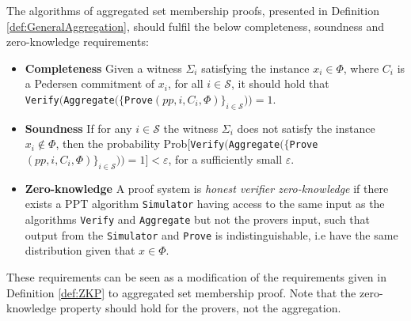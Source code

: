 The algorithms of aggregated set membership proofs, presented in Definition \ref{def:GeneralAggregation}, should fulfil the below completeness, soundness and zero-knowledge requirements:
\begin{itemize}
\item \textbf{Completeness} Given a witness $\Sigma_i$ satisfying the instance $x_i\in\Phi$, where $C_i$ is a Pedersen commitment of $x_i$, for all $i\in\mathcal{S}$, it should hold that
\\
 \texttt{Verify}$($\texttt{Aggregate}$(\{$\texttt{Prove}$(pp,i,C_i,\Phi)\}_{i\in\mathcal{S}}) )= 1$. 
\item \textbf{Soundness} If for any $i\in\mathcal{S}$ the  witness $\Sigma_i$ does not satisfy the  instance $x_i\notin\Phi$, then the probability  Prob$[ $\texttt{Verify}$($\texttt{Aggregate}$(\{$\texttt{Prove}$(pp,i,C_i,\Phi)\}_{i\in\mathcal{S}}) ) = 1] < \varepsilon$, for a sufficiently small $\varepsilon$. 
\item  \textbf{Zero-knowledge} 
A proof system is \textit{honest verifier zero-knowledge} if there exists a PPT algorithm \texttt{Simulator} having access to the same input as the algorithms \texttt{Verify} and \texttt{Aggregate} but not the provers input, such that output from the \texttt{Simulator} and \texttt{Prove} is indistinguishable, i.e have the same distribution given that $x\in\Phi$.  
\end{itemize}

These requirements can be seen as a modification of the requirements given in Definition \ref{def:ZKP} to aggregated set membership proof. Note that the zero-knowledge property should hold for the provers, not the aggregation.



